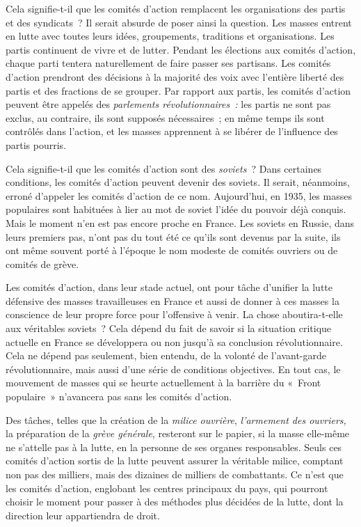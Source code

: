 \documentclass[french,twoside]{book} %
\begin{document}
Cela signifie-t-il que les comités d’action remplacent les organisations des partis et des syndicats ? Il serait absurde de poser ainsi la question. Les masses entrent en lutte avec toutes leurs idées, groupements, traditions et organisations. Les partis continuent de vivre et de lutter. Pendant les élections aux comités d’action, chaque parti tentera naturellement de faire passer ses partisans. Les comités d’action prendront des décisions à la majorité des voix avec l’entière liberté des partis et des fractions de se grouper. Par  rapport aux partis, les comités d’action peuvent être appelés des \emph{parlements révolutionnaires :} les partis ne sont pas exclus, au contraire, ils sont supposés nécessaires ; en même temps ils sont contrôlés dans l’action, et les masses apprennent à se libérer de l’influence des partis pourris.\par
Cela signifie-t-il que les comités d’action sont des \emph{soviets} ? Dans certaines conditions, les comités d’action peuvent devenir des soviets. Il serait, néanmoins, erroné d’appeler les comités d’action de ce nom. Aujourd’hui, en 1935, les masses populaires sont habituées à lier au mot de soviet l’idée du pouvoir déjà conquis. Mais le moment n’en est pas encore proche en France. Les soviets en Russie, dans leurs premiers pas, n’ont pas du tout été ce qu’ils sont devenus par la suite, ils ont même souvent porté à l’époque le nom modeste de comités ouvriers ou de comités de grève.\par
Les comités d’action, dans leur stade actuel, ont pour tâche d’unifier la lutte défensive des masses travailleuses en France et aussi de donner à ces masses la conscience de leur propre force pour l’offensive à venir. La chose aboutira-t-elle aux véritables soviets ? Cela dépend du fait de savoir si la situation critique actuelle en France se développera ou non jusqu’à sa conclusion révolutionnaire. Cela ne dépend pas seulement, bien entendu, de la volonté de l’avant-garde révolutionnaire, mais aussi d’une série de conditions objectives. En tout cas, le mouvement de masses qui se heurte actuellement à la barrière du « Front populaire » n’avancera pas sans les comités d’action.\par
Des tâches, telles que la création de la \emph{milice ouvrière}, \emph{l’armement des ouvriers,} la préparation de la \emph{grève générale}, resteront sur le papier, si la masse elle-même ne s’attelle pas à la lutte, en la personne de ses organes responsables. Seuls ces comités d’action sortis de la lutte peuvent assurer la véritable milice, comptant non pas des milliers, mais des dizaines de milliers de combattants. Ce  n’est que les comités d’action, englobant les centres principaux du pays, qui pourront choisir le moment pour passer à des méthodes plus décidées de la lutte, dont la direction leur appartiendra de droit.\par
\end{document}
